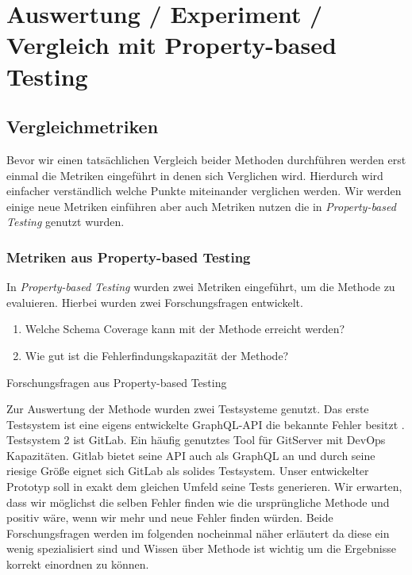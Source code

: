 \chapter{Auswertung / Experiment / Vergleich mit Property-based Testing}
\label{experimente}

\section{Vergleichmetriken}
Bevor wir einen tatsächlichen Vergleich beider Methoden durchführen werden erst einmal die Metriken eingeführt in denen
sich Verglichen wird.
Hierdurch wird einfacher verständlich welche Punkte miteinander verglichen werden.
Wir werden einige neue Metriken einführen aber auch Metriken nutzen die in \textit{Property-based Testing}\cite{property-based-testing} genutzt wurden.

\subsection{Metriken aus Property-based Testing}

In \textit{Property-based Testing} wurden zwei Metriken eingeführt, um die Methode zu evaluieren.
Hierbei wurden zwei Forschungsfragen entwickelt.

\begin{enumerate}
    \item Welche Schema Coverage kann mit der Methode erreicht werden? \cite[vgl. RQ1]{property-based-testing}
    \item Wie gut ist die Fehlerfindungskapazität der Methode? \cite[vgl. RG2]{property-based-testing}
\end{enumerate}
\caption{Forschungsfragen aus Property-based Testing}

Zur Auswertung der Methode wurden zwei Testsysteme genutzt.
Das erste Testsystem ist eine eigens entwickelte GraphQL-API die bekannte Fehler besitzt \cite[vgl. A.1]{property-based-testing}.
Testsystem 2 ist GitLab.
Ein häufig genutztes Tool für GitServer mit DevOps Kapazitäten.
Gitlab bietet seine API auch als GraphQL an und durch seine riesige Größe eignet sich GitLab als solides Testsystem. \cite[vgl. A2]{property-based-testing}
Unser entwickelter Prototyp soll in exakt dem gleichen Umfeld seine Tests generieren.
Wir erwarten, dass wir möglichst die selben Fehler finden wie die ursprüngliche Methode und positiv wäre, wenn wir mehr und neue Fehler finden würden.
Beide Forschungsfragen werden im folgenden nocheinmal näher erläutert da diese ein wenig spezialisiert sind und Wissen über Methode
ist wichtig um die Ergebnisse korrekt einordnen zu können.

